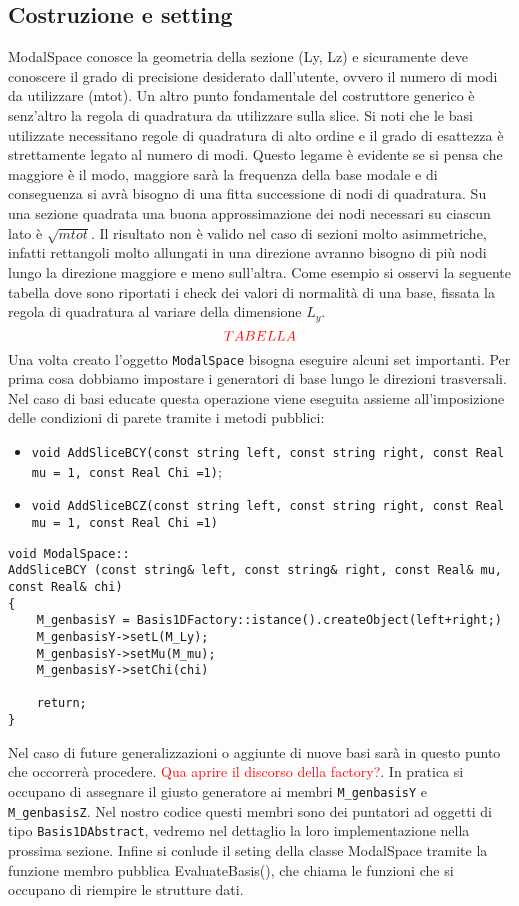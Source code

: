 \subsection{Costruzione e setting}
ModalSpace conosce la geometria della sezione (Ly, Lz) e sicuramente deve conoscere il grado di precisione desiderato dall'utente, ovvero il numero di modi da utilizzare (mtot). 
Un altro punto fondamentale del costruttore generico \`e senz'altro la regola di quadratura da utilizzare sulla slice. Si noti che le basi utilizzate necessitano regole di quadratura di alto ordine e il grado di esattezza \`e strettamente legato al numero di modi. Questo legame \`e evidente se si pensa che maggiore \`e il modo, maggiore sar\`a la frequenza della base modale e di conseguenza si avr\`a bisogno di una fitta successione di nodi di quadratura. Su una sezione quadrata una buona approssimazione dei nodi necessari su ciascun lato \`e $\sqrt{mtot}$. Il risultato non \`e valido nel caso di sezioni molto asimmetriche, infatti rettangoli molto allungati in una direzione avranno bisogno di pi\`u nodi lungo la direzione maggiore e meno sull'altra. Come esempio si osservi la seguente tabella dove sono riportati i check dei valori di normalit\`a di una base, fissata la regola di quadratura al variare della dimensione $L_y$.
\begin{equation}
\textcolor{red}{TABELLA}
\end{equation}
Una volta creato l'oggetto \texttt{ModalSpace} bisogna eseguire alcuni set importanti. Per prima cosa dobbiamo impostare i generatori di base lungo le direzioni trasversali. Nel caso di basi educate questa operazione viene eseguita assieme all'imposizione delle condizioni di parete tramite i metodi pubblici:
\begin{itemize}
\item \texttt{void AddSliceBCY(const string left, const string right, const Real mu = 1, const Real Chi =1)};
\item \texttt{void AddSliceBCZ(const string left, const string right, const Real mu = 1, const Real Chi =1)}
\end{itemize}

\begin{lstlisting}[style = general]
void ModalSpace::
AddSliceBCY (const string& left, const string& right, const Real& mu, const Real& chi)
{
	M_genbasisY = Basis1DFactory::istance().createObject(left+right;)
	M_genbasisY->setL(M_Ly);
	M_genbasisY->setMu(M_mu);
	M_genbasisY->setChi(chi)
	
	return;
}
\end{lstlisting}
 Nel caso di future generalizzazioni o aggiunte di nuove basi sar\`a in questo punto che occorrer\`a procedere.
\textcolor{red}{Qua aprire il discorso della factory?}. In pratica si occupano di assegnare il giusto generatore ai membri \texttt{M\_genbasisY} e \texttt{M\_genbasisZ}. Nel nostro codice questi membri sono dei puntatori ad oggetti di tipo \texttt{Basis1DAbstract}, vedremo nel dettaglio la loro implementazione nella prossima sezione. 
Infine si conlude il seting della classe ModalSpace tramite la funzione membro pubblica EvaluateBasis(), che chiama le funzioni che si occupano di riempire le strutture dati.


